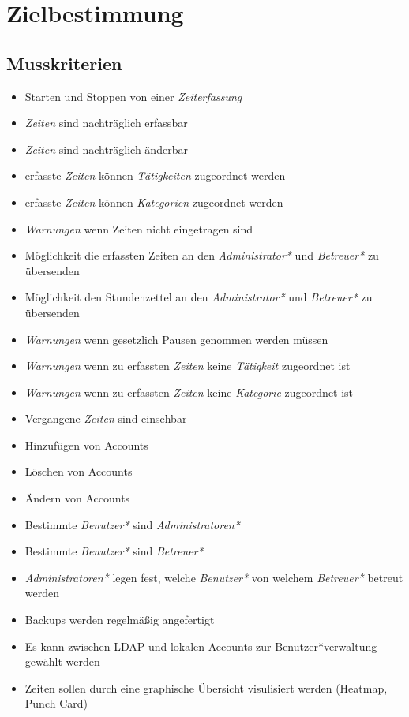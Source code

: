 \section{Zielbestimmung}

\subsection{Musskriterien}

\begin{itemize}
	\item Starten und Stoppen von einer \emph{Zeiterfassung}
	\item \emph{Zeiten} sind nachträglich erfassbar
	\item \emph{Zeiten} sind nachträglich änderbar
	\item erfasste \emph{Zeiten} können \emph{Tätigkeiten} zugeordnet werden
	\item erfasste \emph{Zeiten} können \emph{Kategorien} zugeordnet werden
	\item \emph{Warnungen} wenn Zeiten nicht eingetragen sind
	\item Möglichkeit die erfassten Zeiten an den \emph{Administrator*} und \emph{Betreuer*} zu übersenden
	\item Möglichkeit den Stundenzettel an den \emph{Administrator*} und \emph{Betreuer*} zu übersenden
	\item \emph{Warnungen} wenn gesetzlich Pausen genommen werden müssen
	\item \emph{Warnungen} wenn zu erfassten \emph{Zeiten} keine \emph{Tätigkeit} zugeordnet ist
	\item \emph{Warnungen} wenn zu erfassten \emph{Zeiten} keine \emph{Kategorie} zugeordnet ist
	\item Vergangene \emph{Zeiten} sind einsehbar
	\item Hinzufügen von Accounts
	\item Löschen von Accounts
	\item Ändern von Accounts
	\item Bestimmte \emph{Benutzer*} sind \emph{Administratoren*}
	\item Bestimmte \emph{Benutzer*} sind \emph{Betreuer*}
	\item \emph{Administratoren*} legen fest, welche \emph{Benutzer*} von welchem \emph{Betreuer*} betreut werden
	\item Backups werden regelmäßig angefertigt
	\item Es kann zwischen LDAP und lokalen Accounts zur Benutzer*verwaltung gewählt werden
	\item Zeiten sollen durch eine graphische Übersicht visulisiert werden (Heatmap, Punch Card)
\end{itemize}


